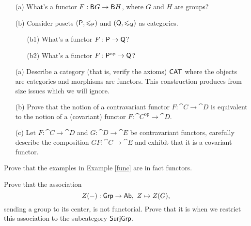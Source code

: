 \vspace{0.1in}

\begin{problem}\label{prob 2.8}\hfill
\begin{itemize}
\item[(a)] What's a functor $F: \mathsf{B}G \to \mathsf{B}H$, where $G$ and $H$ are groups?
\item[(b)] Consider posets $(\mathsf{P},\leqslant_{\mathsf{P}})$ and $(\mathsf{Q},\leqslant_{\mathsf{Q}})$ as categories. 
\begin{itemize}
\item[(b1)] What's a functor $F:\mathsf{P} \to \mathsf{Q}$?
\item[(b2)] What's a functor $F:\mathsf{P}^{\text{op}} \to \mathsf{Q}$?
\end{itemize}
\end{itemize}
\end{problem}

\vspace{0.1in}

\begin{problem}\label{prob 2.9}\hfill
\begin{itemize}
\item[(a)] Describe a category (that is, verify the axioms) $\mathsf{CAT}$ where the objects are categories and morphisms are functors. This construction produces from size issues which we will ignore.
\item[(b)] Prove that the notion of a contravariant functor $F: \cat{C} \to \cat{D}$ is equivalent to the notion of a (covariant) functor $F:\cat{C}^{\text{op}} \to \cat{D}$.
\item[(c)] Let $F:\cat{C} \to \cat{D}$ and $G: \cat{D} \to \cat{E}$ be contravariant functors, carefully describe the composition $GF:\cat{C} \to \cat{E}$ and exhibit that it is a covariant functor.
\end{itemize}
\end{problem}

\vspace{0.1in}

\begin{problem}\label{prob 2.10}
Prove that the examples in Example \ref{func} are in fact functors.
\end{problem}

\vspace{0.1in}

\begin{problem}\label{prob 2.11}
Prove that the association \[Z(-): \mathsf{Grp} \to \mathsf{Ab},\ Z \mapsto Z(G),\]
sending a group to its center, is not functorial. Prove that it is when we restrict this association to the subcategory $\mathsf{SurjGrp}$.
\end{problem}

